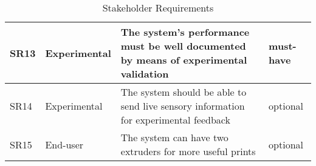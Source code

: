 \begin{table}[H]
\begin{tabular}{|l|l|l|l|}
\hline
SR13 & Experimental & \parbox{8cm}{The system’s performance must be well documented by means of experimental validation} & must-have \\
\hline
SR14 & Experimental & \parbox{8cm}{The system should be able to send live sensory information for experimental feedback} & optional \\
\hline
SR15 & End-user & \parbox{8cm}{The system can have two extruders for more useful prints} & optional \\
\hline
\end{tabular}
\caption{Stakeholder Requirements}
\end{table}

